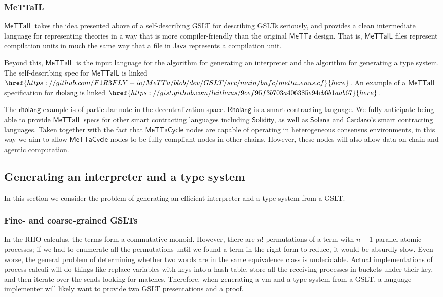 \documentclass{article}
\newcommand{\MC}{\mathsf{MeTTaCycle}}
\begin{document}
\subsubsection{MeTTaIL}

$\mathsf{MeTTaIL}$ takes the idea presented above of a self-describing
GSLT for describing GSLTs seriously, and provides a clean intermediate
language for representing theories in a way that is more
compiler-friendly than the original $\mathsf{MeTTa}$ design. That is,
$\mathsf{MeTTaIL}$ files represent compilation units in much the same
way that a file in $\mathsf{Java}$ represents a compilation unit.

Beyond this, $\mathsf{MeTTaIL}$ is the input language for the
algorithm for generating an interpreter and the algorithm for
generating a type system. The self-describing spec for
$\mathsf{MeTTaIL}$ is
linked $\href{https://github.com/F1R3FLY-io/MeTTa/blob/dev/GSLT/src/main/bnfc/metta_venus.cf}{here}$. An example of a $\mathsf{MeTTaIL}$ specification for $\mathsf{rholang}$ is linked $\href{https://gist.github.com/leithaus/9cef95f3b703a406385e94cb6b1aab67}{here}$.

The $\mathsf{rholang}$ example is of particular note in the
decentralization space. $\mathsf{Rholang}$ is a smart contracting
language. We fully anticipate being able to provide $\mathsf{MeTTaIL}$
specs for other smart contracting languages including
$\mathsf{Solidity}$, as well as $\mathsf{Solana}$ and
$\mathsf{Cardano}$'s smart contracting languages. Taken together with
the fact that $\MC$ nodes are capable of operating in heterogeneous
consensus environments, in this way we aim to allow $\MC$ nodes to be
fully compliant nodes in other chains. However, these nodes will also
allow data on chain and agentic computation.

\subsection{Generating an interpreter and a type system}
\label{Generating an interpreter and a type system}

In this section we consider the problem of generating an efficient interpreter and a type system from a GSLT.

\subsubsection{Fine- and coarse-grained GSLTs}
In the RHO calculus, the terms form a commutative monoid.  However, there are $n!$ permutations of a term with $n-1$ parallel atomic processes; if we had to enumerate all the permutations until we found a term in the right form to reduce, it would be absurdly slow.  Even worse, the general problem of determining whether two words are in the same equivalence class is undecidable.  Actual implementations of process calculi will do things like replace variables with keys into a hash table, store all the receiving processes in buckets under their key, and then iterate over the sends looking for matches.  Therefore, when generating a vm and a type system from a GSLT, a language implementer will likely want to provide two GSLT presentations and a proof.
\end{document}
